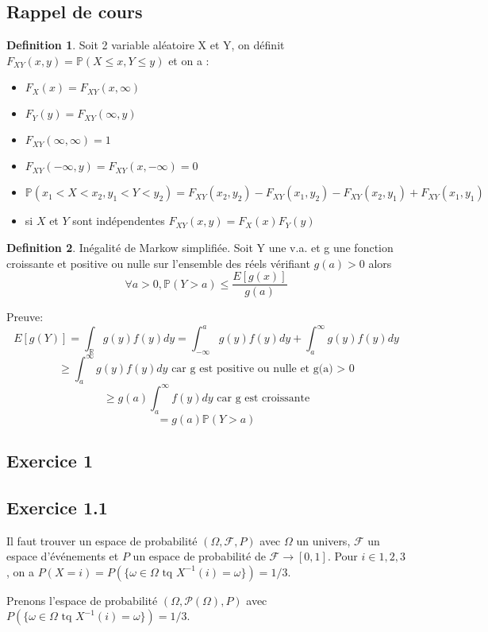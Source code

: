 \documentclass[]{book}
\theoremstyle{definition}
\newtheorem{defn}{Definition}
\newcommand{\bb}[1]{\mathbb{#1}}
\newcommand{\R}{\bb{R}}
\newcommand{\Pe}{\bb{P}}
\begin{document}
\subsection*{Rappel de cours}
\begin{defn}
Soit 2 variable al\'eatoire X et Y, on d\'efinit $F_{XY}(x,y) = \Pe(X \leq x, Y \leq y)$ et on a :
\begin{itemize}
\item $F_X(x) = F_{XY}(x,\infty)$
\item $F_Y(y) = F_{XY}(\infty,y)$
\item $F_{XY}(\infty, \infty)= 1$
\item $F_{XY}(-\infty, y)= F_{XY}(x,-\infty)  = 0$
\item $\Pe(x_1 < X < x_2, y_1 < Y < y_2) = F_{XY}(x_2,y_2) - F_{XY}(x_1,y_2) - F_{XY}(x_2,y_1) + F_{XY}(x_1,y_1)$
\item si $X$ et $Y$ sont ind\'ependentes $F_{XY}(x,y) = F_X(x)F_Y(y)$
\end{itemize}
\end{defn}


\begin{defn}
In\'egalit\'e de Markow simplifi\'ee. Soit Y une v.a. et g une fonction croissante et positive ou nulle sur l'ensemble des r\'eels v\'erifiant $g(a) > 0$ alors 
$$
\forall a > 0, \Pe(Y>a) \leq \frac{E[g(x)]}{g(a)}
$$

Preuve:
$$
E[g(Y)] = \int_{\R}{g(y)f(y)dy} = \int_{-\infty}^{a}{g(y)f(y)dy} + \int_{a}^{\infty}{g(y)f(y)dy}
$$
$$
\geq \int_{a}^{\infty}{g(y)f(y)dy} \text{ car g est positive ou nulle et g(a) > 0}
$$
$$
\geq g(a)\int_{a}^{\infty}{f(y)dy} \text{ car g est croissante}
$$
$$
= g(a) \Pe(Y > a)
$$

\end{defn}


\newpage
\subsection*{Exercice 1}
\subsection*{Exercice 1.1}
Il faut trouver un espace de probabilit\'e $(\Omega, \mathcal{F}, P)$ avec $\Omega$ un univers, $\mathcal{F}$ un espace d'\'ev\'enements et $P$ un espace de probabilit\'e de $\mathcal{F} \to [0,1]$.
Pour $i \in {1,2,3}$, on a $P(X=i) = P(\{\omega \in \Omega \text{ tq } X^{-1}(i) = \omega\}) = 1/3$.  

Prenons l'espace de probabilit\'e $(\Omega, \mathcal{P}(\Omega), P)$ avec $P(\{\omega \in \Omega \text{ tq } X^{-1}(i) = \omega\}) = 1/3$.
\end{document}
